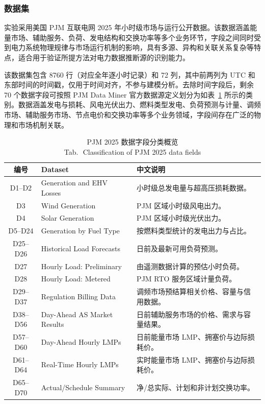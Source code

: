 \documentclass[UTF8,zihao=5,twoside]{ctexart}
\numberwithin{equation}{section}
\newcommand{\tabbicaption}[2]{%
  \caption{#1\\[-0.2em]\small Tab.\,\thetable\ #2}
}
\begin{document}
\subsubsection{数据集}
实验采用美国 PJM 互联电网 2025 年小时级市场与运行公开数据\cite{ref-pjm-dataminer}。该数据涵盖能量市场、辅助服务、负荷、发电结构和交换功率等多个业务环节，字段之间同时受到电力系统物理规律与市场运行机制的影响，具有多源、异构和关联关系复杂等特点，适合用于验证所提方法对电力数据推断源的识别能力。


该数据集包含 8760 行（对应全年逐小时记录）和 72 列，其中前两列为 UTC 和东部时间的时间戳，仅用于时间对齐，不参与建模分析。去除时间字段后，剩余 70 个数据字段可按照 PJM Data Miner 官方数据源定义划分为如表~\ref{tab:data_overview} 所示的类别。数据涵盖发电与损耗、风电光伏出力、燃料类型发电、负荷预测与计量、调频市场、辅助服务市场、节点电价和交换功率等多个业务领域，字段间存在广泛的物理和市场机制关联。

\begin{table}[!tbp]
\centering
\scriptsize
\setlength{\tabcolsep}{2pt}
\tabbicaption{PJM 2025 数据字段分类概览}{Classification of PJM 2025 data fields}
\label{tab:data_overview}
\begin{tabularx}{\columnwidth}{c>{\raggedright\arraybackslash}p{}X}
\toprule
编号 & Dataset & 中文说明 \\
\midrule
D1--D2 & Generation and EHV Losses & 小时级总发电量与超高压损耗数据。 \\
D3 & Wind Generation & PJM 区域小时级风电出力。 \\
D4 & Solar Generation & PJM 区域小时级光伏出力。 \\
D5--D24 & Generation by Fuel Type & 按燃料类型统计的发电出力与占比。 \\
D25--D26 & Historical Load Forecasts & 日前及最新可用负荷预测。 \\
D27 & Hourly Load: Preliminary & 由遥测数据计算的预估小时负荷。 \\
D28 & Hourly Load: Metered & PJM RTO 服务区域计量负荷。 \\
D29--D37 & Regulation Billing Data & 调频市场预结算相关价格、容量与信用数据。 \\
D38--D56 & Day-Ahead AS Market Results & 日前辅助服务市场的价格、需求与容量结果。 \\
D57--D60 & Day-Ahead Hourly LMPs & 日前能量市场 LMP、拥塞价与边际损耗价。 \\
D61--D64 & Real-Time Hourly LMPs & 实时能量市场 LMP、拥塞价与边际损耗价。 \\
D65--D70 & Actual/Schedule Summary & 净/总实际、计划和非计划交换功率。 \\
\bottomrule
\end{tabularx}
\end{table}
\end{document}
